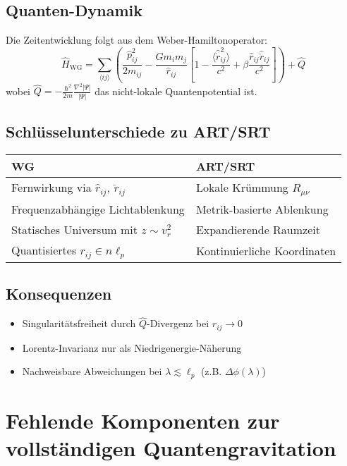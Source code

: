 \subsection{Quanten-Dynamik}
Die Zeitentwicklung folgt aus dem Weber-Hamiltonoperator:
\begin{equation}
    \hat{H}_{\text{WG}} = \sum_{\langle ij \rangle} \left( \frac{\hat{p}_{ij}^2}{2m_{ij}} - \frac{Gm_im_j}{\hat{r}_{ij}} \left[1 - \frac{\langle \hat{\dot{r}}_{ij}^2 \rangle}{c^2} + \beta \frac{\hat{r}_{ij}\hat{\ddot{r}}_{ij}}{c^2}\right] \right) + \hat{Q}
\end{equation}
wobei $\hat{Q} = -\frac{\hbar^2}{2m}\frac{\nabla^2|\Psi|}{|\Psi|}$ das nicht-lokale Quantenpotential ist.

\subsection{Schlüsselunterschiede zu ART/SRT}
\begin{tabular}{ll}
    \textbf{WG} & \textbf{ART/SRT} \\
    \hline
    Fernwirkung via $\hat{r}_{ij}$, $\hat{\ddot{r}}_{ij}$ & Lokale Krümmung $R_{\mu\nu}$ \\
    Frequenzabhängige Lichtablenkung & Metrik-basierte Ablenkung \\
    Statisches Universum mit $z\sim v_r^2$ & Expandierende Raumzeit \\
    Quantisiertes $r_{ij}\in n\ell_p$ & Kontinuierliche Koordinaten \\
\end{tabular}

\subsection{Konsequenzen}
\begin{itemize}
    \item Singularitätsfreiheit durch $\hat{Q}$-Divergenz bei $r_{ij}\to0$
    \item Lorentz-Invarianz nur als Niedrigenergie-Näherung
    \item Nachweisbare Abweichungen bei $\lambda\lesssim\ell_p$ (z.B. $\Delta\phi(\lambda)$)
\end{itemize}

\section{Fehlende Komponenten zur vollständigen Quantengravitation}

